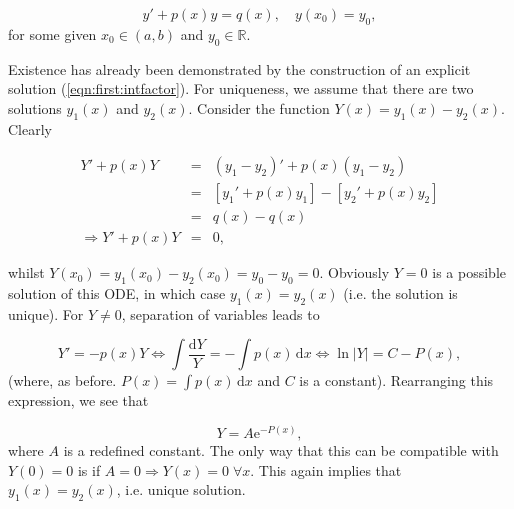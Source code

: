 \documentclass[a4paper]{report}
\begin{document}
\begin{displaymath}
y'+p(x)y=q(x), \quad y\left(x_0\right)=y_0,
\end{displaymath}
\noindent for some given $x_0\in(a,b)$ and $y_0\in\mathbb{R}$. \\

\par {} Existence has already been demonstrated by the construction of an explicit solution (\ref{eqn:first:intfactor}). For uniqueness, we assume that there are two solutions $y_1(x)$ and $y_2(x)$. Consider the function $Y(x)=y_1(x)-y_2(x)$. Clearly

\begin{eqnarray*}
Y' + p(x)Y &=& \left(y_1-y_2\right)' + p(x)\left(y_1-y_2\right)\\
&=& \left[y_1'+p(x)y_1\right] - \left[y_2'+p(x)y_2\right]\\
&=& q(x)-q(x)\\
\Longrightarrow Y' + p(x)Y &=& 0,
\end{eqnarray*}

\noindent whilst $\displaystyle{Y\left(x_0\right) = y_1\left(x_0\right)-y_2\left(x_0\right) = y_0-y_0 = 0}$. Obviously $Y=0$ is a possible solution of this ODE, in which case $y_1(x)=y_2(x)$ (i.e. the solution is unique). For $Y\neq0$, separation of variables leads to

\begin{displaymath}
Y' = -p(x)Y \iff \int \frac{\mathrm{d}Y}{Y} = -\int p(x)\,\mathrm{d}x \iff \ln|Y| = C-P(x),
\end{displaymath}
\noindent (where, as before. $\displaystyle{P(x) = \int p(x)\,\mathrm{d}x}$ and $C$ is a constant). Rearranging this expression, we see that

\begin{displaymath}
Y = A\mathrm{e}^{-P(x)}, 
\end{displaymath}
\noindent where $A$ is a redefined constant. The only way that this can be compatible with $Y(0)=0$ is if $A=0 \Longrightarrow Y(x)=0 \;\forall x$. This again implies that $y_1(x)=y_2(x)$, i.e. unique solution. 
\end{document}
